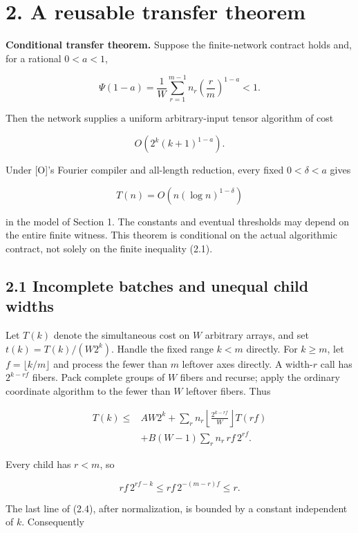 \documentclass[
  11pt,
]{article}
\begin{document}
\section{2. A reusable transfer
theorem}\label{a-reusable-transfer-theorem}

\textbf{Conditional transfer theorem.} Suppose the finite-network
contract holds and, for a rational \(0<a<1\),

\[\Psi(1-a)=\frac1W\sum_{r=1}^{m-1} n_r\left(\frac rm\right)^{1-a}<1.
\tag{2.1}\]

Then the network supplies a uniform arbitrary-input tensor algorithm of
cost

\[O\!\left(2^k(k+1)^{1-a}\right).
\tag{2.2}\]

Under {[}O{]}'s Fourier compiler and all-length reduction, every fixed
\(0<\delta<a\) gives

\[T(n)=O\!\left(n(\log n)^{1-\delta}\right)
\tag{2.3}\]

in the model of Section 1. The constants and eventual thresholds may
depend on the entire finite witness. This theorem is conditional on the
actual algorithmic contract, not solely on the finite inequality (2.1).

\subsection{2.1 Incomplete batches and unequal child
widths}\label{incomplete-batches-and-unequal-child-widths}

Let \(T(k)\) denote the simultaneous cost on \(W\) arbitrary arrays, and
set \(t(k)=T(k)/(W2^k)\). Handle the fixed range \(k<m\) directly. For
\(k\ge m\), let \(f=\lfloor k/m\rfloor\) and process the fewer than
\(m\) leftover axes directly. A width-\(r\) call has \(2^{k-rf}\)
fibers. Pack complete groups of \(W\) fibers and recurse; apply the
ordinary coordinate algorithm to the fewer than \(W\) leftover fibers.
Thus

\[\begin{split}
T(k)\le{}& A W2^k+
\sum_r n_r\left\lfloor\frac{2^{k-rf}}W\right\rfloor T(rf)\\
&+B(W-1)\sum_r n_r\,rf\,2^{rf}.
\end{split}
\tag{2.4}\]

Every child has \(r<m\), so

\[rf\,2^{rf-k}\le rf\,2^{-(m-r)f}\le r.\]

The last line of (2.4), after normalization, is bounded by a constant
independent of \(k\). Consequently
\end{document}
